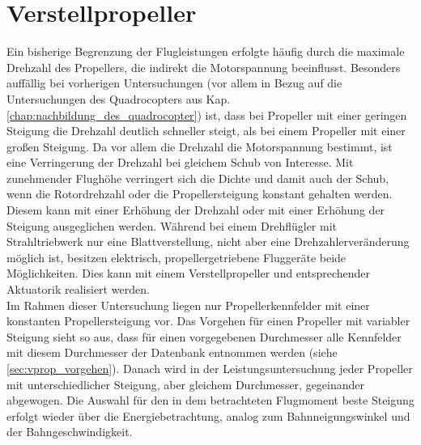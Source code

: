 \section{Verstellpropeller}
\label{sec:verstellprop}
Ein bisherige Begrenzung der Flugleistungen erfolgte häufig durch die maximale Drehzahl des Propellers, die indirekt die Motorspannung beeinflusst. 
Besonders auffällig bei vorherigen Untersuchungen (vor allem in Bezug auf die Untersuchungen des Quadrocopters aus Kap. \ref{chap:nachbildung_des_quadrocopter}) ist, dass bei Propeller mit einer geringen Steigung die Drehzahl deutlich schneller steigt, als bei einem Propeller mit einer großen Steigung. Da vor allem die Drehzahl die Motorspannung bestimmt, ist eine Verringerung der Drehzahl bei gleichem Schub von Interesse. Mit zunehmender Flughöhe verringert sich die Dichte und damit auch der Schub, wenn die Rotordrehzahl oder die Propellersteigung konstant gehalten werden. Diesem kann mit einer Erhöhung der Drehzahl oder mit einer Erhöhung der Steigung ausgeglichen werden. Während bei einem Drehflügler mit Strahltriebwerk nur eine Blattverstellung, nicht aber eine Drehzahlerveränderung möglich ist, besitzen elektrisch, propellergetriebene Fluggeräte beide Möglichkeiten. Dies kann mit einem Verstellpropeller und entsprechender Aktuatorik realisiert werden. \\
Im Rahmen dieser Untersuchung liegen nur Propellerkennfelder mit einer konstanten Propellersteigung vor. Das Vorgehen für einen Propeller mit variabler Steigung sieht so aus, dass für einen vorgegebenen Durchmesser alle Kennfelder mit diesem Durchmesser der Datenbank entnommen werden (siehe \ref{sec:vprop_vorgehen}). Danach wird in der Leistungsuntersuchung jeder Propeller mit unterschiedlicher Steigung, aber gleichem Durchmesser, gegeinander abgewogen. Die Auswahl für den in dem betrachteten Flugmoment beste Steigung erfolgt wieder über die Energiebetrachtung, analog zum Bahnneigungswinkel und der Bahngeschwindigkeit.



